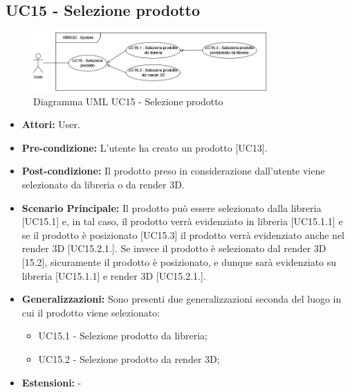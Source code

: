 \subsection{UC15 - Selezione prodotto}
\begin{figure}[H]
  \centering
  \includegraphics[width=0.8\textwidth]{UC_diagrams_11-20/UC15_sys.drawio.png}
   \caption{Diagramma UML UC15 - Selezione prodotto}
\end{figure}
\begin{itemize}
    \item \textbf{Attori:} User.
    \item \textbf{Pre-condizione:}  L'utente ha creato un prodotto [UC13].
    \item \textbf{Post-condizione:} Il prodotto preso in considerazione dall'utente viene selezionato da libreria o da render 3D.
    \item \textbf{Scenario Principale:} Il prodotto può essere selezionato dalla libreria [UC15.1] e, in tal caso, il prodotto verrà evidenziato in libreria [UC15.1.1] 
    e se il prodotto è posizionato [UC15.3] il prodotto verrà evidenziato anche nel render 3D [UC15.2.1.]. Se invece il prodotto è selezionato dal render 3D [15.2], sicuramente il prodotto è posizionato, e dunque sarà evidenziato su libreria [UC15.1.1] e render 3D [UC15.2.1.].
    \item \textbf{Generalizzazioni:} Sono presenti due generalizzazioni seconda del luogo in cui il prodotto viene selezionato:
    \begin{itemize}
        \item UC15.1 - Selezione prodotto da libreria;
        \item UC15.2 - Selezione prodotto da render 3D;
    \end{itemize}
    \item \textbf{Estensioni:} -
\end{itemize}


